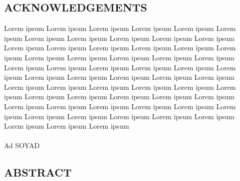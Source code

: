 \documentclass[12pt,english]{article}
\begin{document}
\pagestyle{fancy}

\begin{onehalfspace}
\end{onehalfspace}

\setcounter{page}{3}



\fancyhead{}

\fancyfoot{}

\fancyfoot[R]{\fontsize{12pt}{14,4pt}\selectfont{\thepage}} \renewcommand{\headrulewidth}{0pt}

\renewcommand{\footrulewidth}{0pt}


\begin{onehalfspace}

\section*{\noindent ACKNOWLEDGEMENTS}
\end{onehalfspace}

\noindent Lorem ipsum Lorem ipsum Lorem ipsum Lorem ipsum Lorem ipsum
Lorem ipsum Lorem ipsum Lorem ipsum Lorem ipsum Lorem ipsum Lorem
ipsum Lorem ipsum Lorem ipsum Lorem ipsum Lorem ipsum Lorem ipsum
Lorem ipsum Lorem ipsum Lorem ipsum Lorem ipsum Lorem ipsum Lorem
ipsum Lorem ipsum Lorem ipsum Lorem ipsum Lorem ipsum Lorem ipsum
Lorem ipsum Lorem ipsum Lorem ipsum Lorem ipsum Lorem ipsum Lorem
ipsum Lorem ipsum Lorem ipsum Lorem ipsum Lorem ipsum Lorem ipsum
Lorem ipsum Lorem ipsum Lorem ipsum Lorem ipsum Lorem ipsum Lorem
ipsum Lorem ipsum Lorem ipsum Lorem ipsum Lorem ipsum Lorem ipsum
Lorem ipsum Lorem ipsum Lorem ipsum Lorem ipsum Lorem ipsum Lorem
ipsum Lorem ipsum Lorem ipsum Lorem ipsum \\
\\
Ad SOYAD

\begin{onehalfspace}
\noindent \pagebreak
\end{onehalfspace}


\begin{onehalfspace}

\section*{\noindent ABSTRACT}
\end{onehalfspace}
\end{document}

